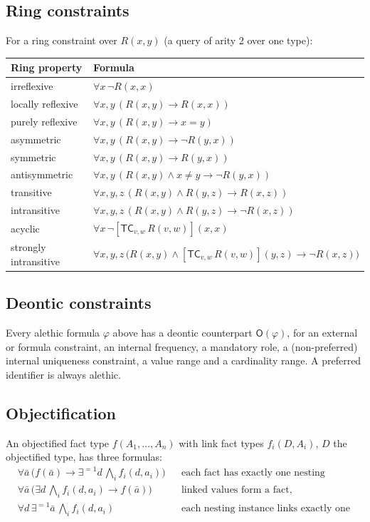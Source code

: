 \documentclass[11pt, a4paper]{article}
\newcommand{\TC}{\mathsf{TC}}
\newcommand{\tcl}[4]{[\TC_{#1,#2}\,#3](#4)}
\newcommand{\Ob}{\mathsf{O}}
\begin{document}
\subsection{Ring constraints}

For a ring constraint over $R(x,y)$ (a query of arity 2 over one type):

\begin{center}
\small
\begin{tabular}{l l}
\toprule
\textbf{Ring property} & \textbf{Formula} \\
\midrule
irreflexive & $\forall x\,\neg R(x,x)$ \\
locally reflexive & $\forall x,y\,(R(x,y)\to R(x,x))$ \\
purely reflexive & $\forall x,y\,(R(x,y)\to x=y)$ \\
asymmetric & $\forall x,y\,(R(x,y)\to\neg R(y,x))$ \\
symmetric & $\forall x,y\,(R(x,y)\to R(y,x))$ \\
antisymmetric & $\forall x,y\,(R(x,y)\wedge x\ne y\to\neg R(y,x))$ \\
transitive & $\forall x,y,z\,(R(x,y)\wedge R(y,z)\to R(x,z))$ \\
intransitive & $\forall x,y,z\,(R(x,y)\wedge R(y,z)\to \neg R(x,z))$ \\
acyclic & $\forall x\,\neg\tcl{v}{w}{R(v,w)}{x,x}$ \\
strongly intransitive & $\forall x,y,z\,\bigl(R(x,y)\wedge\tcl{v}{w}{R(v,w)}{y,z}\to\neg R(x,z)\bigr)$ \\
\bottomrule
\end{tabular}
\end{center}

\subsection{Deontic constraints}

Every alethic formula $\varphi$ above has a deontic counterpart
$\Ob(\varphi)$, for an external or formula constraint, an internal frequency, a
mandatory role, a (non-preferred) internal uniqueness constraint, a value
range and a cardinality range. A preferred identifier is always alethic.

\subsection{Objectification}

An objectified fact type $f(A_1,\dots,A_n)$ with link fact types $f_i(D,
A_i)$, $D$ the objectified type, has three formulas:
\begin{align*}
&\forall \bar a\,\bigl(f(\bar a) \to \exists^{=1}d\,\textstyle\bigwedge_i f_i(d,a_i)\bigr) && \text{each fact has exactly one nesting instance,}\\
&\forall \bar a\,\bigl(\exists d\,\textstyle\bigwedge_i f_i(d,a_i) \to f(\bar a)\bigr) && \text{linked values form a fact,}\\
&\forall d\,\exists^{=1}\bar a\,\textstyle\bigwedge_i f_i(d,a_i) && \text{each nesting instance links exactly one combination.}
\end{align*}
\end{document}
